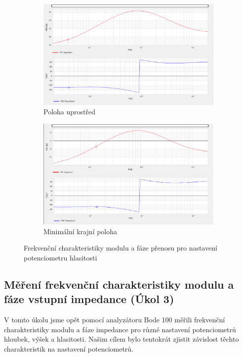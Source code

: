 \documentclass[a4paper, czech]{article}
\begin{document}
\begin{figure}[H]
    \centering
    \begin{subfigure}{0.49\textwidth}
        \includegraphics[width=\textwidth]{nkzt9_2_min_min_mid.png}
        \caption{Poloha uprostřed}
    \end{subfigure}
    \hfill
    \begin{subfigure}{0.49\textwidth}
        \includegraphics[width=\textwidth]{nkzt9_2_min_min_max.png}
        \caption{Minimální krajní poloha}
    \end{subfigure}
    \caption{Frekvenční charakteristiky modulu a fáze přenosu pro nastavení potenciometru hlasitosti} 
\end{figure}

\subsection{Měření frekvenční charakteristiky modulu a fáze vstupní impedance (Úkol 3)}

V tomto úkolu jsme opět pomocí analyzátoru Bode 100 měřili frekvenční charakteristiky
modulu a fáze impedance pro různé nastavení potenciometrů hloubek, výšek a hlasitosti.
Našim cílem bylo tentokrát zjistit závislost těchto charakteristik na nastavení potenciometrů.
\end{document}
